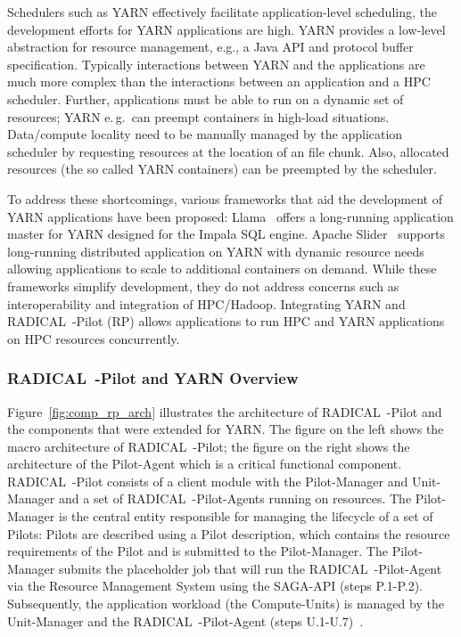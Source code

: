 Schedulers such as YARN effectively facilitate application-level scheduling, the development efforts for YARN applications are high. YARN provides a low-level abstraction for resource management, e.g., a Java API and protocol buffer specification.
Typically interactions between YARN and the applications are much more complex than the interactions between an application and a HPC scheduler.
Further, applications must be able to run on a dynamic set of resources; YARN e.\,g.\ can preempt containers in high-load situations.
Data/compute locality need to be manually managed by the application scheduler by requesting resources at the location of an file chunk.
Also, allocated resources (the so called YARN containers) can be preempted by the scheduler.

To address these shortcomings, various frameworks that aid the development of YARN applications have been proposed: Llama~\cite{llama} offers a long-running application master for YARN designed for the Impala SQL engine.
Apache Slider~\cite{apache-slider} supports long-running distributed application on YARN with dynamic resource needs allowing applications to scale to additional containers on demand.
While these frameworks simplify development, they do not address concerns such as interoperability and integration of HPC/Hadoop.
Integrating YARN and RADICAL~-Pilot (RP) allows applications to run HPC and YARN applications on HPC resources concurrently.

\subsubsection{RADICAL~-Pilot and YARN Overview}
\label{sssec:rp_yarn}
Figure~\ref{fig:comp_rp_arch} illustrates the architecture of RADICAL~-Pilot and the components that were extended for YARN.
The figure on the left shows the macro architecture of RADICAL~-Pilot; the figure on the right shows the architecture of the Pilot-Agent which is a critical functional component.
RADICAL~-Pilot consists of a client module with the Pilot-Manager and Unit-Manager and a set of RADICAL~-Pilot-Agents running on resources.
The Pilot-Manager is the central entity responsible for managing the lifecycle of a set of Pilots: Pilots are described using a Pilot description, which contains the resource requirements of the Pilot and is submitted to the Pilot-Manager.
The Pilot-Manager submits the placeholder job that will run the RADICAL~-Pilot-Agent via the Resource Management System using the SAGA-API (steps P.1-P.2).
Subsequently, the application workload (the Compute-Units) is managed by the Unit-Manager and the RADICAL~-Pilot-Agent (steps U.1-U.7)~\cite{merzky2019using}.


